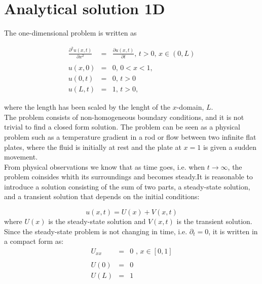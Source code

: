 \documentclass{article}
\begin{document}
\section{Analytical solution 1D}
The one-dimensional problem is written as 

\begin{subequations}
	\begin{eqnarray}
	\frac{\partial^2 u(x,t)}{\partial x^2} &=& \frac{\partial u(x,t)}{\partial t} \textit{, } t> 0 \textit{, } x \in (0,L) \\ \nonumber
	\\
	u(x,0) &=& 0 \textit{, } 0 <x < 1 \textit{,} \\
	u(0,t) &=& 0 \textit{, } t>0 \\
	u(L,t) &=& 1 \textit{, } t>0,
	\end{eqnarray}
\end{subequations}

where the length has been scaled by the lenght of the $x$-domain, $L$.\\

The problem consists of non-homogeneous boundary conditions, and it is not trivial to find a closed form solution. The problem can be seen as a physical problem such as a temperature gradient in a rod or flow between two infinite flat plates, where the fluid is initially at rest and the plate at $x=1$ is given a sudden movement. \\

From physical observations we know that as time goes, i.e. when $t\rightarrow \infty$,  the problem coinsides whith its surroundings and becomes steady.It is reasonable to introduce a solution consisting of the sum of two parts, a steady-state solution, and a transient solution that depends on the initial conditions:

\begin{equation}
u(x,t) = U(x) + V(x,t)
\end{equation}
where $U(x)$ is the steady-state solution and $V(x,t)$ is the transient solution.\\ 

Since the steady-state problem is not changing in time, i.e. $\partial_ t = 0$, it is written in a compact form as:
\begin{subequations}
	\begin{eqnarray}
	\label{eqn:steadyStateSODE}
	U_{xx} &=& 0 \textit{ , } x \in [0,1]\\ \nonumber
	\\
	U(0) &=& 0 \textit{  } \\
	U(L) &=& 1
	\end{eqnarray}
\end{subequations}
\end{document}
